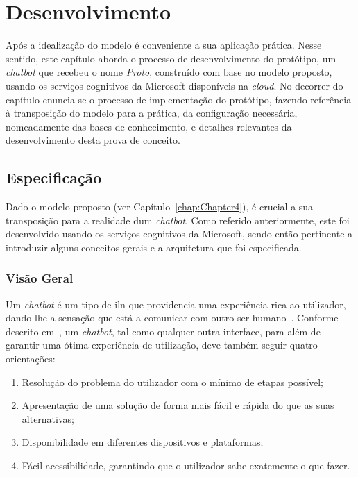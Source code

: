 \chapter{Desenvolvimento}
\label{chap:Chapter5}
Após a idealização do modelo é conveniente a sua aplicação prática. Nesse sentido, este capítulo aborda o processo de desenvolvimento do protótipo, um \textit{chatbot} que recebeu o nome \textit{Proto}, construído com base no modelo proposto, usando os serviços cognitivos da Microsoft disponíveis na \textit{cloud}. No decorrer do capítulo enuncia-se o processo de implementação do protótipo, fazendo referência à transposição do modelo para a prática, da configuração necessária, nomeadamente das bases de conhecimento, e detalhes relevantes da desenvolvimento desta prova de conceito.

\section{Especificação}
\label{sec:chap05_specification}
Dado o modelo proposto (ver Capítulo~\ref{chap:Chapter4}), é crucial a sua transposição para a realidade dum \textit{chatbot}. Como referido anteriormente, este foi desenvolvido usando os serviços cognitivos da Microsoft, sendo então pertinente a introduzir alguns conceitos gerais e a arquitetura que foi especificada.

\subsection{Visão Geral}
Um \textit{chatbot} é um tipo de \gls{iln} que providencia uma experiência rica ao utilizador, dando-lhe a sensação que está a comunicar com outro ser humano~\parencite[Concepts]{microsoft_bot_documentation}.
Conforme descrito em~\textcite[Principles of bot design]{microsoft_bot_documentation}, um \textit{chatbot}, tal como qualquer outra interface, para além de garantir uma ótima experiência de utilização, deve também seguir quatro orientações:

\begin{enumerate}
    \item 
    {
        Resolução do problema do utilizador com o mínimo de etapas possível;
    }
    \item
    {
        Apresentação de uma solução de forma mais fácil e rápida do que as suas alternativas;
    }
    \item 
    {
        Disponibilidade em diferentes dispositivos e plataformas;
    }
    \item 
    {
        Fácil acessibilidade, garantindo que o utilizador sabe exatemente o que fazer.
    }
\end{enumerate}

